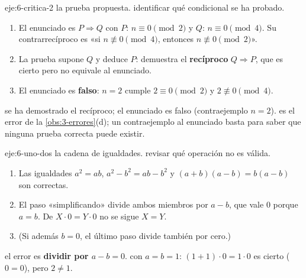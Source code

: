 \begin{solucion}{eje:6-critica-2}
\datos la prueba propuesta.
\planteamiento identificar qué condicional se ha probado.
\pasos
\begin{enumerate}[label=\arabic*.]
  \item El enunciado es $P\Rightarrow Q$ con $P$: $n\equiv 0\pmod 2$ y $Q$: $n\equiv 0\pmod 4$. Su contrarrecíproco es «si $n\not\equiv 0\pmod 4$, entonces $n\not\equiv 0\pmod 2$».
  \item La prueba supone $Q$ y deduce $P$: demuestra el \textbf{recíproco} $Q\Rightarrow P$, que es cierto pero no equivale al enunciado.
  \item El enunciado es \textbf{falso}: $n=2$ cumple $2\equiv 0\pmod 2$ y $2\not\equiv 0\pmod 4$.
\end{enumerate}
\resultado se ha demostrado el recíproco; el enunciado es falso (contraejemplo $n=2$).
\comprobacion es el error de la \cref{obs:3-errores}(d); un contraejemplo al enunciado basta para saber que ninguna prueba correcta puede existir.
\end{solucion}

\begin{solucion}{eje:6-uno-dos}
\datos la cadena de igualdades.
\planteamiento revisar qué operación no es válida.
\pasos
\begin{enumerate}[label=\arabic*.]
  \item Las igualdades $a^{2}=ab$, $a^{2}-b^{2}=ab-b^{2}$ y $(a+b)(a-b)=b(a-b)$ son correctas.
  \item El paso «simplificando» divide ambos miembros por $a-b$, que vale $0$ porque $a=b$. De $X\cdot 0=Y\cdot 0$ no se sigue $X=Y$.
  \item (Si además $b=0$, el último paso divide también por cero.)
\end{enumerate}
\resultado el error es \textbf{dividir por $a-b=0$}.
\comprobacion con $a=b=1$: $(1+1)\cdot 0=1\cdot 0$ es cierto ($0=0$), pero $2\neq 1$.
\end{solucion}

